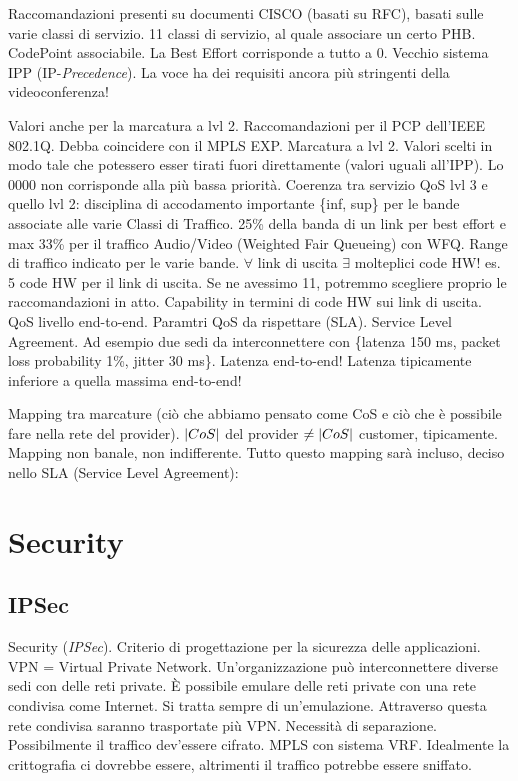 Raccomandazioni presenti su documenti CISCO (basati su RFC), basati sulle varie classi di servizio. 11 classi di servizio, al quale associare un certo PHB. CodePoint associabile. La Best Effort corrisponde a tutto a 0. Vecchio sistema IPP (IP-\textit{Precedence}). La voce ha dei requisiti ancora più stringenti della videoconferenza!

Valori anche per la marcatura a lvl 2. Raccomandazioni per il PCP dell'IEEE 802.1Q. Debba coincidere con il MPLS EXP. Marcatura a lvl 2. Valori scelti in modo tale che potessero esser tirati fuori direttamente (valori uguali all'IPP). Lo 0000 non corrisponde alla più bassa priorità. Coerenza tra servizio QoS lvl 3 e quello lvl 2: disciplina di accodamento importante \{inf, sup\} per le bande associate alle varie Classi di Traffico. 25\% della banda di un link per best effort e max 33\% per il traffico Audio/Video (Weighted Fair Queueing) con WFQ. Range di traffico indicato per le varie bande. $\forall$ link di uscita $\exists$ molteplici code HW! es. 5 code HW per il link di uscita. Se ne avessimo 11, potremmo scegliere proprio le raccomandazioni in atto. Capability in termini di code HW sui link di uscita. QoS livello end-to-end. Paramtri QoS da rispettare (SLA). Service Level Agreement. Ad esempio due sedi da interconnettere con \{latenza 150 ms, packet loss probability 1\%, jitter 30 ms\}. Latenza end-to-end! Latenza tipicamente inferiore a quella massima end-to-end!

Mapping tra marcature (ciò che abbiamo pensato come CoS e ciò che è possibile fare nella rete del provider). $\left\vert{CoS}\right\vert$ del provider $\neq \left\vert{CoS}\right\vert$ customer, tipicamente. Mapping non banale, non indifferente. Tutto questo mapping sarà incluso, deciso nello SLA (Service Level Agreement):



\section{Security}

\subsection{IPSec}

Security (\textit{IPSec}). Criterio di progettazione per la sicurezza delle applicazioni. VPN = Virtual Private Network. Un'organizzazione può interconnettere diverse sedi con delle reti private. \`E possibile emulare delle reti private con una rete condivisa come Internet. Si tratta sempre di un'emulazione. Attraverso questa rete condivisa saranno trasportate più VPN. Necessità di separazione. Possibilmente il traffico dev'essere cifrato. MPLS con sistema VRF. Idealmente la crittografia ci dovrebbe essere, altrimenti il traffico potrebbe essere sniffato.

